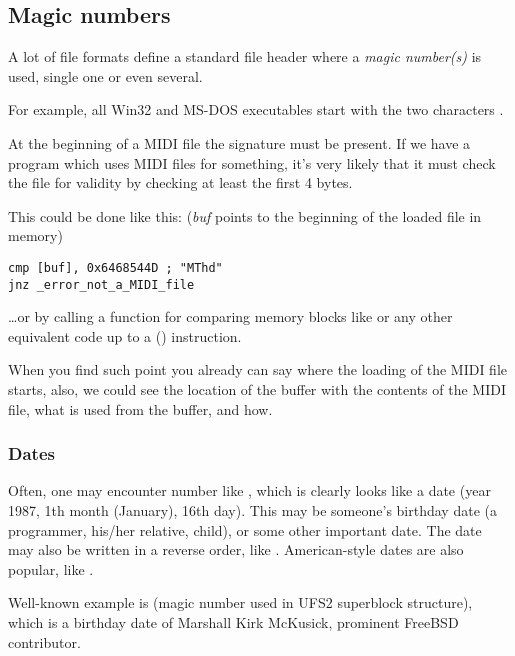 \subsection{Magic numbers}
\label{magic_numbers}

A lot of file formats define a standard file header where a \emph{magic number(s)} is used, single one or even several.


For example, all Win32 and MS-DOS executables start with the two characters .


At the beginning of a MIDI file the  signature must be present. 
If we have a program which uses MIDI files for something,
it's very likely that it must check the file for validity by checking at least the first 4 bytes.

This could be done like this:
(\emph{buf} points to the beginning of the loaded file in memory)

\begin{lstlisting}[style=customasmx86]
cmp [buf], 0x6468544D ; "MThd"
jnz _error_not_a_MIDI_file
\end{lstlisting}


\dots or by calling a function for comparing memory blocks like  or any other equivalent code
up to a  () instruction.

When you find such point you already can say where the loading of the MIDI file starts,
also, we could see the location
of the buffer with the contents of the MIDI file, what is used from the buffer, and how.

\subsubsection{Dates}


Often, one may encounter number like , which is clearly looks like a date (year 1987, 1th month (January), 16th day).
This may be someone's birthday date (a programmer, his/her relative, child), or some other important date.
The date may also be written in a reverse order, like .
American-style dates are also popular, like .

Well-known example is  (magic number used in UFS2 superblock structure), which is a birthday date of Marshall Kirk McKusick, prominent FreeBSD contributor.

